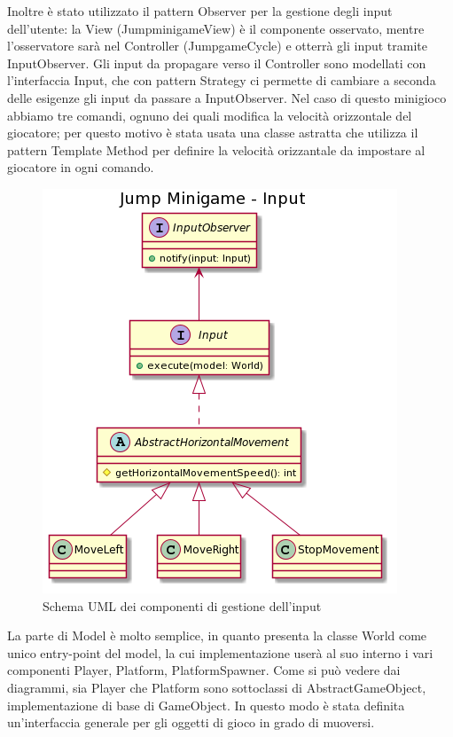 \documentclass[a4paper,12pt]{report}
\begin{document}
	Inoltre è stato utilizzato il pattern Observer per la gestione degli input dell'utente: la View (JumpminigameView) è il componente osservato, mentre l'osservatore sarà nel Controller (JumpgameCycle) e otterrà gli input tramite InputObserver.\newline
	Gli input da propagare verso il Controller sono modellati con l'interfaccia Input, che con pattern Strategy ci permette di cambiare a seconda delle esigenze gli input da passare a InputObserver.
	Nel caso di questo minigioco abbiamo tre comandi, ognuno dei quali modifica la velocità orizzontale del giocatore;
    per questo motivo è stata usata una classe astratta che utilizza il pattern Template Method per definire la velocità orizzantale da impostare al giocatore in ogni comando.
    \begin{figure}[h]
        \centering{}
        \includegraphics{images/picchiotti/jumpinput.png}
        \caption{Schema UML dei componenti di gestione dell'input}
        \label{img:jumpinput}
    \end{figure}
	La parte di Model è molto semplice, in quanto presenta la classe World come unico entry-point del model, la cui implementazione userà al suo interno i vari componenti Player, Platform, PlatformSpawner.\newline
	Come si può vedere dai diagrammi, sia Player che Platform sono sottoclassi di AbstractGameObject, implementazione di base di GameObject.
    In questo modo è stata definita un'interfaccia generale per gli oggetti di gioco in grado di muoversi.\newline
\end{document}
